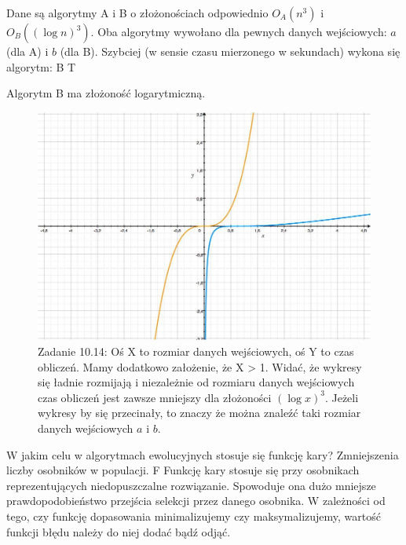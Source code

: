 \answer
{Dane są algorytmy A i B o złożonościach odpowiednio $O_A(n^3)$ i $O_B((\log n)^3)$. Oba algorytmy wywołano dla pewnych danych wejściowych: $a$ (dla A) i $b$ (dla B). Szybciej (w sensie czasu mierzonego w sekundach) wykona się algorytm:}
{B}
{T}
{}
{Algorytm B ma złożoność logarytmiczną.

\begin{figure}[!ht]
\centering
\includegraphics[width=\textwidth]{10/10-4-2}
\caption*{Zadanie 10.14: Oś X to rozmiar danych wejściowych, oś Y to czas obliczeń. Mamy dodatkowo założenie, że X > 1. Widać, że wykresy się ładnie rozmijają i niezależnie od rozmiaru danych wejściowych czas obliczeń jest zawsze mniejszy dla złożoności $(\log x)^3$. Jeżeli wykresy by się przecinały, to znaczy że można znaleźć taki rozmiar danych wejściowych $a$ i $b$.}
\end{figure}
}




\answer
{W jakim celu w algorytmach ewolucyjnych stosuje się funkcję kary?}
{Zmniejszenia liczby osobników w populacji.}
{F}
{Funkcję kary stosuje się przy osobnikach reprezentujących niedopuszczalne rozwiązanie. Spowoduje ona dużo mniejsze prawdopodobieństwo przejścia selekcji przez danego osobnika. W zależności od tego, czy funkcję dopasowania minimalizujemy czy maksymalizujemy, wartość funkcji błędu należy do niej dodać bądź odjąć.}
{}
